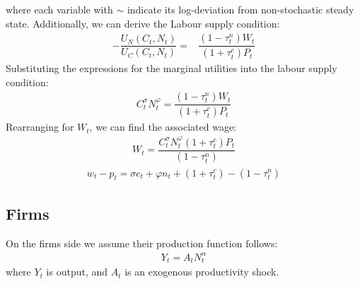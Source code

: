 \documentclass[11pt]{article}
\newcommand{\bb}{\bigbreak\noindent}
\begin{document}
\begin{spacing}{2}
where each variable with $\sim$ indicate its log-deviation from non-stochastic steady state.
\bb
Additionally, we can derive the Labour supply condition:
\begin{align}
	- \dfrac{U_N(C_t,N_t)}{U_C(C_t,N_t)} =& \dfrac{(1-\tau_t^n)W_t}{(1+\tau_t^c)P_t}
\end{align}
Substituting the expressions for the marginal utilities into the labour supply condition:
\begin{align*}
	 C_t^{\sigma} N_t^{\varphi} =  \dfrac{(1-\tau_t^n)W_t}{(1+\tau_t^c)P_t}
\end{align*}
Rearranging for $W_t$, we can find the associated wage:
\begin{align*}
	W_t =  \dfrac{C_t^{\sigma} N_t^{\varphi}(1+\tau_t^c)P_t  }{(1-\tau_t^n)}
\end{align*}
\begin{align*}
		w_t - p_t = \sigma c_t + \varphi n_t + (1+\tau_t^c) - (1-\tau_t^n)
\end{align*}





\subsection{Firms}
On the firms side we assume their production function follows:
\begin{align}
	Y_t = A_t N_t^\alpha 
\end{align}
where \(Y_t\) is output, and \(A_t\) is an exogenous productivity shock. 


\end{spacing}
\end{document}
